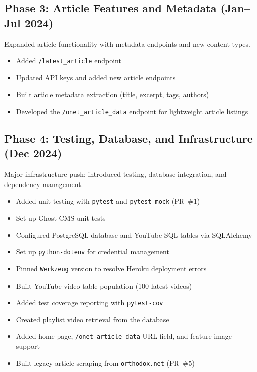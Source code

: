 \documentclass[12pt]{article}
\begin{document}
\subsection{Phase 3: Article Features and Metadata (Jan--Jul 2024)}

Expanded article functionality with metadata endpoints and new content types.

\begin{itemize}
    \item Added \texttt{/latest\_article} endpoint
    \item Updated API keys and added new article endpoints
    \item Built article metadata extraction (title, excerpt, tags, authors)
    \item Developed the \texttt{/onet\_article\_data} endpoint for lightweight article listings
\end{itemize}

\subsection{Phase 4: Testing, Database, and Infrastructure (Dec 2024)}

Major infrastructure push: introduced testing, database integration, and dependency management.

\begin{itemize}
    \item Added unit testing with \texttt{pytest} and \texttt{pytest-mock} (PR~\#1)
    \item Set up Ghost CMS unit tests
    \item Configured PostgreSQL database and YouTube SQL tables via SQLAlchemy
    \item Set up \texttt{python-dotenv} for credential management
    \item Pinned \texttt{Werkzeug} version to resolve Heroku deployment errors
    \item Built YouTube video table population (100 latest videos)
    \item Added test coverage reporting with \texttt{pytest-cov}
    \item Created playlist video retrieval from the database
    \item Added home page, \texttt{/onet\_article\_data} URL field, and feature image support
    \item Built legacy article scraping from \texttt{orthodox.net} (PR~\#5)
\end{itemize}
\end{document}
